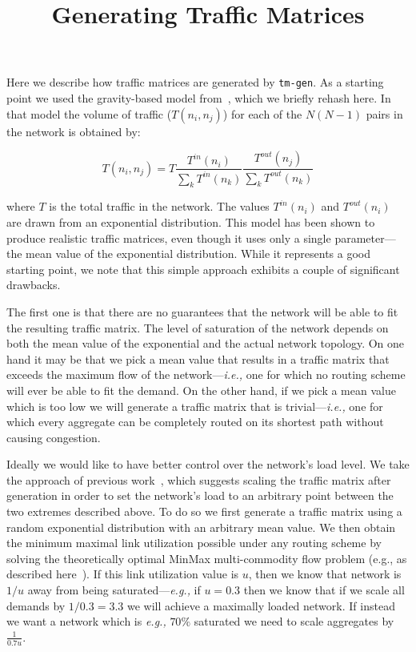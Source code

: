 \documentclass[12pt, letterpaper]{article}
\title{Generating Traffic Matrices}
\date{}
\begin{document}
\maketitle

Here we describe how traffic matrices are generated by
\verb|tm-gen|. As a starting point we used the gravity-based model
from~\cite{tm-synthesis-ccr05}, which we briefly rehash here. In that
model the volume of traffic ($T(n_i,n_j)$) for each of the $N(N-1)$
pairs in the network is obtained by:

\begin{equation}
\label{eq:tm-gen}
T(n_i,n_j) = T \frac{T^{in}(n_i)}{\sum_{k} T^{in}(n_k)} \frac{T^{out}(n_j)}{\sum_{k} T^{out}(n_k)}
\end{equation}

where $T$ is the total traffic in the network. The values
$T^{in}(n_i)$ and $T^{out}(n_i)$ are drawn from an exponential
distribution. This model has been shown to produce realistic traffic
matrices, even though it uses only a single parameter---the mean value
of the exponential distribution. While it represents a good starting
point, we note that this simple approach exhibits a couple of
significant drawbacks.

The first one is that there are no guarantees that the network will be
able to fit the resulting traffic matrix. The level of saturation of
the network depends on both the mean value of the exponential and the
actual network topology. On one hand it may be that we pick a mean
value that results in a traffic matrix that exceeds the maximum flow
of the network---{\em i.e.,} one for which no routing scheme will ever be
able to fit the demand. On the other hand, if we pick a mean value
which is too low we will generate a traffic matrix that is
trivial---{\em i.e.,} one for which every aggregate can be completely
routed on its shortest path without causing congestion.

Ideally we would like to have better control over the network's load
level. We take the approach of previous work~\cite{haddadi2013recent}, which suggests
scaling the traffic matrix after generation in order to set the
network's load to an arbitrary point between the two extremes
described above. To do so we first generate a traffic matrix using a random
exponential distribution with an arbitrary mean value. We then obtain
the minimum maximal link utilization possible under any routing scheme
by solving the theoretically optimal MinMax multi-commodity flow
problem (e.g., as described here~\cite{TeXCP-Kandula05}). If this link
utilization value is $u$, then we know that network is $1/u$ away from
being saturated---{\em e.g.,} if $u=0.3$ then we know that if we scale
all demands by $1 / 0.3 = 3.3$ we will achieve a maximally loaded
network. If instead we want a network which is {\em e.g.,} $70\%$
saturated we need to scale aggregates by $\frac{1}{0.7u}$.
\end{document}
